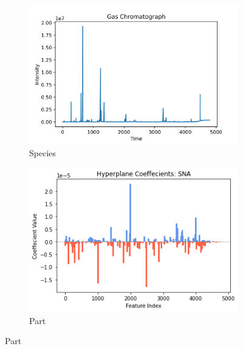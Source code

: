 \documentclass[runningheads]{llncs}
\begin{document}
\begin{figure}[htb]
  \centering  
  \caption[Two numerical solutions]{    
    Hyperplane coefficients $\beta_t$.
    }
  \begin{subfigure}[b]{.55\linewidth}
    \includegraphics[width=\linewidth]{chromatograph.png}
    \caption{Species}\label{fig:fish-hyperplane-coeffcients}
  \end{subfigure}
  \begin{subfigure}[b]{.55\linewidth}
    \includegraphics[width=\linewidth]{fish_hyperplane_sna.png}
    \caption{Part}\label{fig:part-hyperplane-coeffcients}
  \end{subfigure}
  \label{fig:hyperplane-chromatograph}
\end{figure} 
\end{document}

